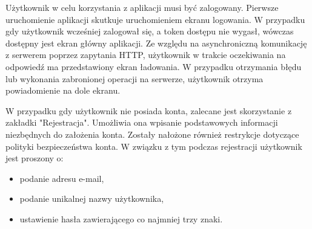 {%

Użytkownik w celu korzystania z aplikacji musi być zalogowany. Pierwsze uruchomienie aplikacji skutkuje uruchomieniem ekranu logowania. W przypadku gdy użytkownik wcześniej zalogował się, a token dostępu nie wygasł, wówczas dostępny jest ekran główny aplikacji. Ze względu na asynchroniczną komunikację z serwerem poprzez zapytania HTTP, użytkownik w trakcie oczekiwania na odpowiedź ma przedstawiony ekran ładowania. W przypadku otrzymania błędu lub wykonania zabronionej operacji na serwerze, użytkownik otrzyma powiadomienie na dole ekranu.


W przypadku gdy użytkownik nie posiada konta, zalecane jest skorzystanie z zakładki "Rejestracja". Umożliwia ona wpisanie podstawowych informacji niezbędnych do założenia konta. Zostały nałożone również restrykcje dotyczące polityki bezpieczeństwa konta. W związku z tym podczas rejestracji użytkownik jest proszony o:
\begin{itemize}[noitemsep]
	\item podanie adresu e-mail,
	\item podanie unikalnej nazwy użytkownika,
	\item ustawienie hasła zawierającego co najmniej trzy znaki.
\end{itemize} 
}
\newpage
